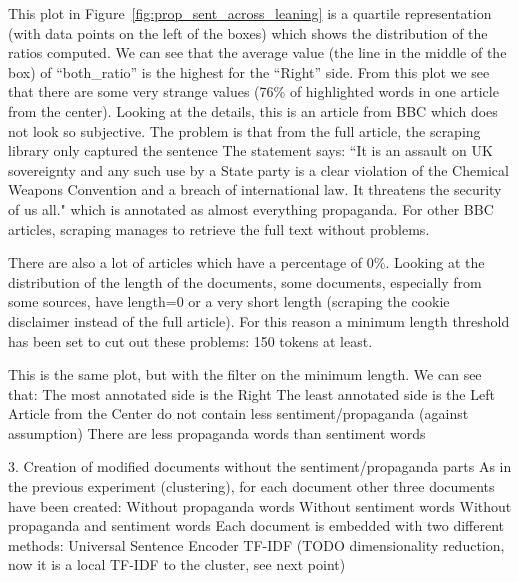 This plot in Figure~\ref{fig:prop_sent_across_leaning} is a quartile representation (with data points on the left of the boxes) which shows the distribution of the ratios computed. We can see that the average value (the line in the middle of the box) of “both\_ratio” is the highest for the “Right” side.
From this plot we see that there are some very strange values (76\% of highlighted words in one article from the center). Looking at the details, this is an article from BBC which does not look so subjective. The problem is that from the full article, the scraping library only captured the sentence The statement says: ``It is an assault on UK sovereignty and any such use by a State party is a clear violation of the Chemical Weapons Convention and a breach of international law. It threatens the security of us all." which is annotated as almost everything propaganda. For other BBC articles, scraping manages to retrieve the full text without problems.

There are also a lot of articles which have a percentage of 0\%. Looking at the distribution of the length of the documents, some documents, especially from some sources, have length=0 or a very short length (scraping the cookie disclaimer instead of the full article).
For this reason a minimum length threshold has been set to cut out these problems: 150 tokens at least.

This is the same plot, but with the filter on the minimum length.
We can see that:
The most annotated side is the Right
The least annotated side is the Left
Article from the Center do not contain less sentiment/propaganda (against assumption)
There are less propaganda words than sentiment words



3. Creation of modified documents without the sentiment/propaganda parts
As in the previous experiment (clustering), for each document other three documents have been created:
Without propaganda words
Without sentiment words
Without propaganda and sentiment words
Each document is embedded with two different methods:
Universal Sentence Encoder
TF-IDF (TODO dimensionality reduction, now it is a local TF-IDF to the cluster, see next point)


